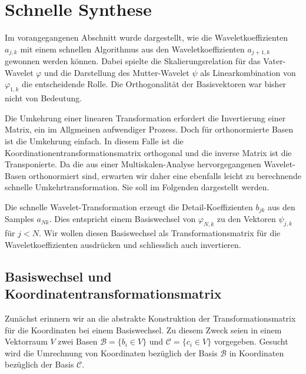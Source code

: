 %
%
%
\section{Schnelle Synthese\label{section:schnelle-synthese}}
Im vorangegangenen Abschnitt wurde dargestellt, wie die Waveletkoeffizienten
$a_{j,k}$ mit einem schnellen Algorithmus aus den Waveletkoeffizienten
$a_{j+1,k}$ gewonnen werden können.
Dabei spielte die Skalierungsrelation für das Vater-Wavelet $\varphi$ und die
Darstellung des Mutter-Wavelet $\psi$ als Linearkombination von $\varphi_{1,k}$
die entscheidende Rolle.
Die Orthogonalität der Basisvektoren war bisher nicht von Bedeutung.

Die Umkehrung einer linearen Transformation erfordert die
Invertierung einer Matrix, ein im Allgmeinen aufwendiger Prozess.
Doch für orthonormierte Basen ist die Umkehrung einfach.
In diesem Falle ist die Koordinationentransformationsmatrix
orthogonal und die inverse Matrix ist die Transponierte.
Da die aus einer Multiskalen-Analyse hervorgegangenen Wavelet-Basen
orthonormiert sind, erwarten wir daher eine ebenfalls leicht zu
berechnende schnelle Umkehrtransformation.
Sie soll im Folgenden dargestellt werden.

Die schnelle Wavelet-Transformation erzeugt die Detail-Koeffizienten
$b_{jk}$ aus den Samples $a_{Nk}$.
Dies entspricht einem Basiswechsel von $\varphi_{N,k}$ zu den
Vektoren $\psi_{j,k}$ für $j<N$.
Wir wollen diesen Basiswechsel als Transformationsmatrix für 
die Waveletkoeffizienten ausdrücken und schliesslich auch invertieren.

%
%
\subsection{Basiswechsel und Koordinatentransformationsmatrix}
Zunächst erinnern wir an die abstrakte Konstruktion der
Transformationsmatrix für die Koordinaten bei einem Basiswechsel.
Zu diesem Zweck seien in einem Vektorraum $V$ zwei Basen
$\mathcal{B}=\{b_i\in V\}$ und $\mathcal{C}=\{c_i\in V\}$ vorgegeben.
Gesucht wird die Umrechnung von Koordinaten bezüglich der Basis
$\mathcal{B}$ in Koordinaten bezüglich der Basis $\mathcal{C}$.

